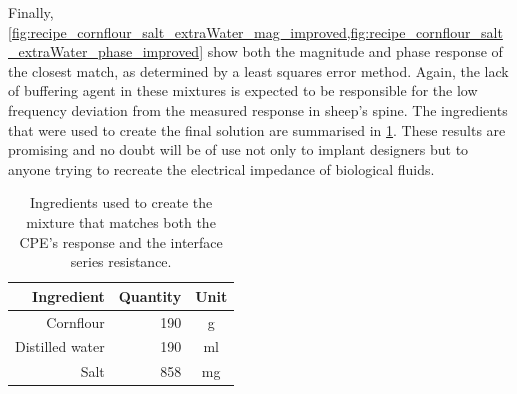   Finally, \cref{fig:recipe_cornflour_salt_extraWater_mag_improved,fig:recipe_cornflour_salt_extraWater_phase_improved} show both the magnitude and phase response of the closest match, as determined by a least squares error method.
  Again, the lack of buffering agent in these mixtures is expected to be responsible for the low frequency deviation from the measured response in sheep's spine.
  The ingredients that were used to create the final solution are summarised in \cref{tab:pt2-sheep-recipe}.
  These results are promising and no doubt will be of use not only to implant designers but to anyone trying to recreate the electrical impedance of biological fluids.

  \begin{table}
    \centering
    \begin{tabular}{r | r | c}
      Ingredient & Quantity & Unit \\
      \hline
      Cornflour & 190 & g \\
      Distilled water & 190  & ml  \\
      Salt  & 858 & mg  \\
    \end{tabular}
    \caption{\label{tab:pt2-sheep-recipe}Ingredients used to create the mixture that matches both the CPE's response and the interface series resistance.}
  \end{table}


